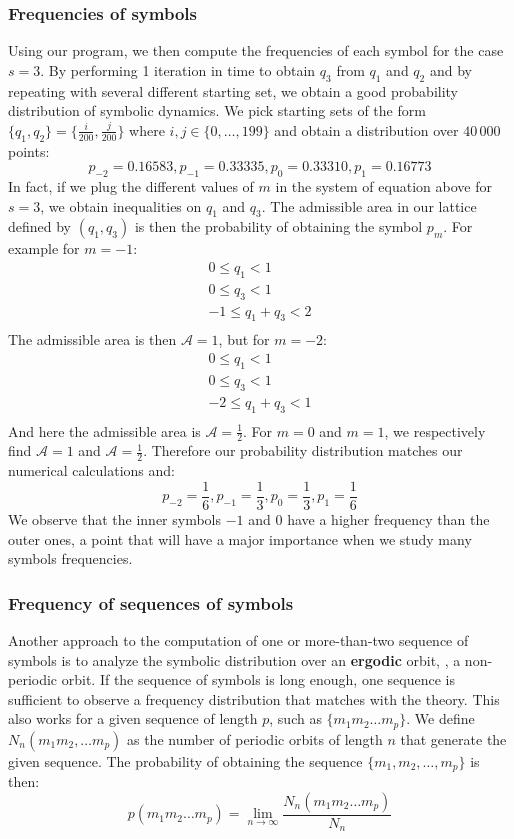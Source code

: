 \subsubsection{Frequencies of symbols}
Using our program, we then compute the frequencies of each symbol for the case $s = 3$. By performing 1 iteration in time to obtain $q_3$ from $q_1$ and $q_2$ and by repeating with several different starting set, we obtain a good probability distribution of symbolic dynamics. We pick starting sets of the form $\{q_1, q_2\} = \{\frac{i}{200}, \frac{j}{200}\}$ where $i, j \in \{0,\dots, 199\}$ and obtain a distribution over $40\,000$ points:
\[
p_{-2} =0.16583, p_{-1} = 0.33335, p_{0} =0.33310, p_{1} = 0.16773
\]
In fact, if we plug the different values of $m$ in the system of equation above for $s = 3$, we obtain inequalities on $q_1$ and $q_3$. The admissible area in our lattice defined by $(q_1, q_3)$ is then the probability of obtaining the symbol $p_m$. For example for $m = -1$:
\[
\begin {array} {c}
0 \leqslant q_1 < 1 \\
0 \leqslant q_3 < 1 \\
-1 \leqslant q_1 + q_3 < 2 \\
\end {array}
\]
The admissible area is then $\mathcal{A} = 1$, but for $m = -2$:
\[
\begin {array} {c}
0 \leqslant q_1 < 1 \\
0 \leqslant q_3 < 1 \\
-2 \leqslant q_1 + q_3 < 1 \\
\end {array}
\]
And here the admissible area is $\mathcal{A} = \frac{1}{2}$. For $m = 0$ and $m = 1$, we respectively find $\mathcal{A} = 1$ and $\mathcal{A} = \frac{1}{2}$. Therefore our probability distribution matches our numerical calculations and:
\[
p_{-2} =\frac{1}{6}, p_{-1} =  \frac{1}{3}, p_{0} =\frac{1}{3}, p_{1} = \frac{1}{6}
\]
We observe that the inner symbols $-1$ and $0$ have a higher frequency than the outer ones, a point that will have a major importance when we study many symbols frequencies.

\subsubsection{Frequency of sequences of symbols}

\hskip 0.2in Another approach to the computation of one or more-than-two
sequence of symbols is to analyze the symbolic distribution over an
\textbf{ergodic} orbit, \ie, a non-periodic orbit. If the sequence of
symbols is long enough, one sequence is sufficient to observe a
frequency distribution that matches with the theory. This also works for
a given sequence of length $p$, such as $\{m_1 m_2 \dots m_p\}$. We
define $N_n(m_1 m_2, \dots m_p)$ as the number of periodic orbits of
length $n$ that generate the given sequence. The probability of obtaining
the sequence $\{m_1,m_2, \dots, m_p\}$ is then:
\[
p(m_1 m_2 \dots m_p) = \lim_{n\to\infty} \frac{N_n(m_1 m_2 \dots m_p)}{N_n}
\]

